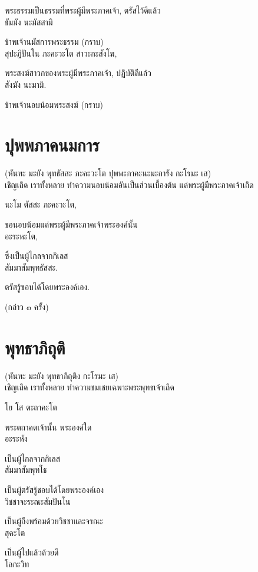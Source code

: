 \documentclass{article}
\begin{document}
พระธรรมเป็นธรรมที่พระผู้มีพระภาคเจ้า, ตรัสไว้ดีแล้ว\\
ธัมมัง นะมัสสามิ

ข้าพเจ้านมัสการพระธรรม (กราบ)\\
สุปะฏิปันโน ภะคะวะโต สาวะกะสังโฆ,

พระสงฆ์สาวกของพระผู้มีพระภาคเจ้า, ปฏิบัติดีแล้ว\\
สังฆัง นะมามิ.

ข้าพเจ้านอบน้อมพระสงฆ์ (กราบ)

\pagebreak
\section{ปุพพภาคนมการ}
\begin{center}
(หันทะ มะยัง พุทธัสสะ ภะคะวะโต ปุพพะภาคะนะมะการัง กะโรมะ เส)\\
เชิญเถิด เราทั้งหลาย ทำความนอบน้อมอันเป็นส่วนเบื้องต้น แด่พระผู้มีพระภาคเจ้าเถิด
\end{center}
นะโม ตัสสะ ภะคะวะโต,

ขอนอบน้อมแด่พระผู้มีพระภาคเจ้าพระองค์นั้น\\
อะระหะโต,

ซึ่งเป็นผู้ไกลจากกิเลส\\
สัมมาสัมพุทธัสสะ.

ตรัสรู้ชอบได้โดยพระองค์เอง.	
\begin{center}
(กล่าว ๓ ครั้ง)
\end{center}

\pagebreak

\section{พุทธาภิถุติ}
\begin{center}
(หันทะ มะยัง พุทธาภิถุติง กะโรมะ เส)\\
เชิญเถิด เราทั้งหลาย ทำความชมเชยเฉพาะพระพุทธเจ้าเถิด
\end{center}
โย โส ตะถาคะโต

พระตถาคตเจ้านั้น พระองค์ใด\\
อะระหัง

เป็นผู้ไกลจากกิเลส\\
สัมมาสัมพุทโธ

เป็นผู้ตรัสรู้ชอบได้โดยพระองค์เอง\\
วิชชาจะระณะสัมปันโน

เป็นผู้ถึงพร้อมด้วยวิชชาและจรณะ\\
สุคะโต

เป็นผู้ไปแล้วด้วยดี\\
โลกะวิท
\end{document}
